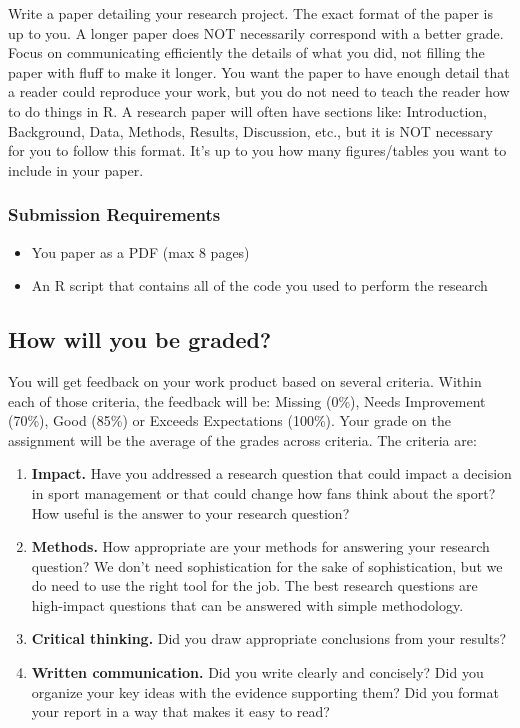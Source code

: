 \documentclass{article}
\begin{document}
      Write a paper detailing your research project. The exact format of the paper is up to you. A longer paper does NOT necessarily correspond with a better grade. Focus on communicating efficiently the details of what you did, not filling the paper with fluff to make it longer. You want the paper to have enough detail that a reader could reproduce your work, but you do not need to teach the reader how to do things in R. A research paper will often have sections like: Introduction, Background, Data, Methods, Results, Discussion, etc., but it is NOT necessary for you to follow this format. It's up to you how many figures/tables you want to include in your paper.
  
      \subsubsection*{\sc Submission Requirements}

        \begin{itemize}
          \item You paper as a PDF (max 8 pages)
          \item An R script that contains all of the code you used to perform the research
        \end{itemize}
   
    \subsection*{\sc How will you be graded?}
 
      You will get feedback on your work product based on several criteria. Within each of those criteria, the feedback will be: Missing (0\%), Needs Improvement (70\%), Good (85\%) or Exceeds Expectations (100\%). Your grade on the assignment will be the average of the grades across criteria. The criteria are:
      \begin{enumerate}
        \item {\bf Impact.} Have you addressed a research question that could impact a decision in sport management or that could change how fans think about the sport? How useful is the answer to your research question?
        \item {\bf Methods.} How appropriate are your methods for answering your research question? We don't need sophistication for the sake of sophistication, but we do need to use the right tool for the job. The best research questions are high-impact questions that can be answered with simple methodology.
        \item {\bf Critical thinking.} Did you draw appropriate conclusions from your results?
        \item {\bf Written communication.} Did you write clearly and concisely? Did you organize your key ideas with the evidence supporting them? Did you format your report in a way that makes it easy to read?
      \end{enumerate}
\end{document}
